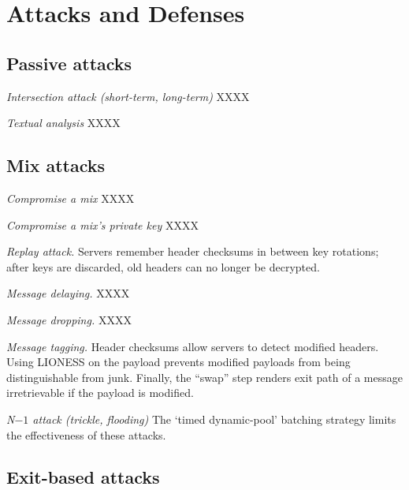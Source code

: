 \documentclass[11pt]{IEEEtran}
\renewcommand\url{\begingroup \def\UrlLeft{<}\def\UrlRight{>}\urlstyle{tt}\Url}
\begin{document}
\section{Attacks and Defenses}
\label{sec:attacks}
%


\subsection{Passive attacks}
\label{subsec:passive-attacks}

\begin{description}
\item \emph{Intersection attack (short-term, long-term)} XXXX
\item \emph{Textual analysis} XXXX
\end{description}

\subsection{Mix attacks}
\label{subsec:mix-attacks}

\begin{description}
\item \emph{Compromise a mix} XXXX
\item \emph{Compromise a mix's private key} XXXX
\item \emph{Replay attack.}  Servers remember header checksums in
  between key rotations; after keys are discarded, old headers can no
  longer be decrypted.
\item \emph{Message delaying.}  XXXX
\item \emph{Message dropping.} XXXX
\item \emph{Message tagging.}  Header checksums allow servers to
  detect modified headers.  Using LIONESS on the payload prevents modified
  payloads from being distinguishable from junk.  Finally, the
  ``swap'' step renders exit path of a message irretrievable if the
  payload is modified.
\item \emph{N$-1$ attack (trickle, flooding)} The `timed dynamic-pool'
  batching strategy limits the effectiveness of these attacks.
\end{description}

\subsection{Exit-based attacks}
\label{subsec:attacks-exitbased}
\end{document}

